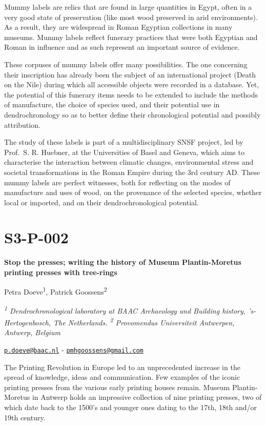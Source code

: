 \documentclass[
]{book}
\begin{document}
Mummy labels are relics that are found in large quantities in Egypt, often in a very good state of preservation (like most wood preserved in arid environments). As a result, they are widespread in Roman Egyptian collections in many museums. Mummy labels reflect funerary practices that were both Egyptian and Roman in influence and as such represent an important source of evidence.

These corpuses of mummy labels offer many possibilities. The one concerning their inscription has already been the subject of an international project (Death on the Nile) during which all accessible objects were recorded in a database. Yet, the potential of this funerary items needs to be extended to include the methods of manufacture, the choice of species used, and their potential use in dendrochronology so as to better define their chronological potential and possibly attribution.

The study of these labels is part of a multidisciplinary SNSF project, led by Prof.~S. R. Huebner, at the Universities of Basel and Geneva, which aims to characterise the interaction between climatic changes, environmental stress and societal transformations in the Roman Empire during the 3rd century AD. These mummy labels are perfect witnesses, both for reflecting on the modes of manufacture and uses of wood, on the provenance of the selected species, whether local or imported, and on their dendrochronological potential.

\hypertarget{s3-p-002}{%
\section*{S3-P-002}\label{s3-p-002}}

\textbf{Stop the presses; writing the history of Museum Plantin-Moretus printing presses with tree-rings}

Petra Doeve\textsuperscript{1}, Patrick Goossens\textsuperscript{2}

\emph{\textsuperscript{1} Dendrochronological laboratory at BAAC Archaeology and Building history, 's-Hertogenbosch, The Netherlands. \textsuperscript{2} Provomendus Universiteit Antwerpen, Antwerp, Belgium}

\href{mailto:p.doeve@baac.nl}{\nolinkurl{p.doeve@baac.nl}} - \href{mailto:pmhgoossens@gmail.com}{\nolinkurl{pmhgoossens@gmail.com}}

The Printing Revolution in Europe led to an unprecedented increase in the spread of knowledge, ideas and communication. Few examples of the iconic printing presses from the various early printing houses remain. Museum Plantin-Moretus in Antwerp holds an impressive collection of nine printing presses, two of which date back to the 1500's and younger ones dating to the 17th, 18th and/or 19th century.
\end{document}
